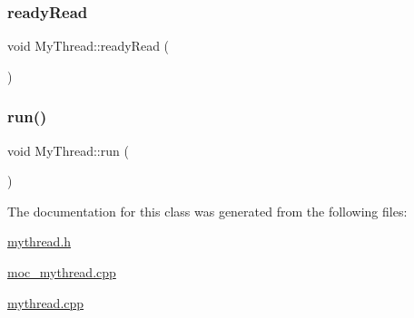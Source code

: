 \mbox{\label{class_my_thread_a277618fdd448b927f2e250c2076fc176}} 
\subsubsection{\texorpdfstring{ready\+Read}{readyRead}}
{\footnotesize\ttfamily void My\+Thread\+::ready\+Read (\begin{DoxyParamCaption}{ }\end{DoxyParamCaption})\hspace{0.3cm}{\ttfamily [slot]}}

\mbox{\label{class_my_thread_a48f2e366e852087c53705f64e1ee65c2}} 
\subsubsection{\texorpdfstring{run()}{run()}}
{\footnotesize\ttfamily void My\+Thread\+::run (\begin{DoxyParamCaption}{ }\end{DoxyParamCaption})}



The documentation for this class was generated from the following files\+:\begin{DoxyCompactItemize}
\item 
\mbox{\hyperlink{mythread_8h}{mythread.\+h}}\item 
\mbox{\hyperlink{moc__mythread_8cpp}{moc\+\_\+mythread.\+cpp}}\item 
\mbox{\hyperlink{mythread_8cpp}{mythread.\+cpp}}\end{DoxyCompactItemize}
